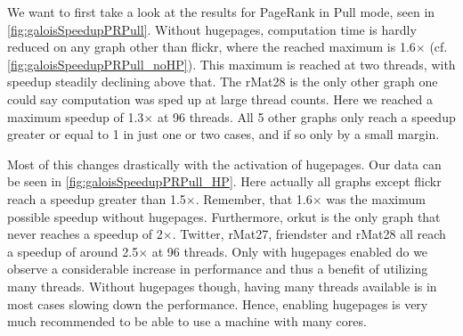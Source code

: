 We want to first take a look at the results for PageRank in Pull mode, seen in \autoref{fig:galoisSpeedupPRPull}. Without hugepages, computation time is hardly reduced on any graph other than flickr, where the reached maximum is 1.6$\times$ (cf. \autoref{fig:galoisSpeedupPRPull_noHP}). This maximum is reached at two threads, with speedup steadily declining above that.
The rMat28 is the only other graph one could say computation was sped up at large thread counts. Here we reached a maximum speedup of 1.3$\times$ at 96 threads.
All 5 other graphs only reach a speedup greater or equal to 1 in just one or two cases, and if so only by a small margin.

Most of this changes drastically with the activation of hugepages. Our data can be seen in \autoref{fig:galoisSpeedupPRPull_HP}. 
Here actually all graphs except flickr reach a speedup greater than 1.5$\times$. Remember, that 1.6$\times$ was the maximum possible speedup without hugepages.
Furthermore, orkut is the only graph that never reaches a speedup of 2$\times$.
Twitter, rMat27, friendster and rMat28 all reach a speedup of around 2.5$\times$ at 96 threads.
Only with hugepages enabled do we observe a considerable increase in performance and thus a benefit of utilizing many threads.
Without hugepages though, having many threads available is in most cases slowing down the performance. Hence, enabling hugepages is very much recommended to be able to use a machine with many cores.

